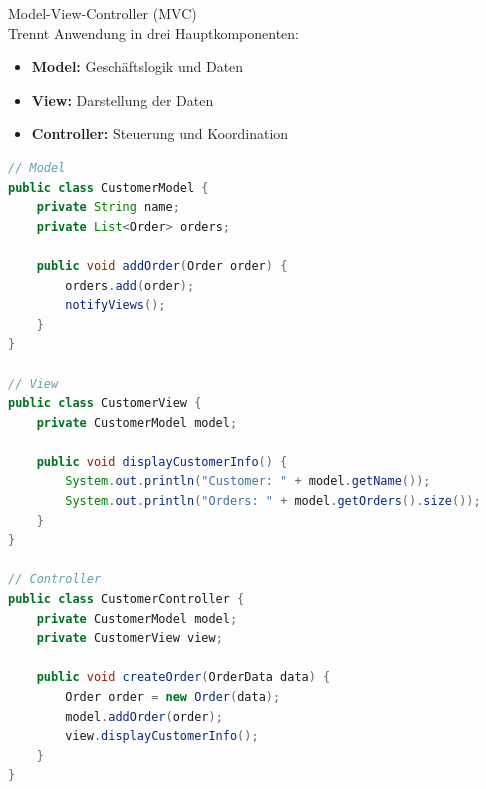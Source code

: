 \begin{concept}{Model-View-Controller (MVC)}\\
Trennt Anwendung in drei Hauptkomponenten:
\begin{itemize}
    \item \textbf{Model:} Geschäftslogik und Daten
    \item \textbf{View:} Darstellung der Daten
    \item \textbf{Controller:} Steuerung und Koordination
\end{itemize}

\begin{lstlisting}[language=Java, style=basesmol]
// Model
public class CustomerModel {
    private String name;
    private List<Order> orders;
    
    public void addOrder(Order order) {
        orders.add(order);
        notifyViews();
    }
}

// View
public class CustomerView {
    private CustomerModel model;
    
    public void displayCustomerInfo() {
        System.out.println("Customer: " + model.getName());
        System.out.println("Orders: " + model.getOrders().size());
    }
}

// Controller
public class CustomerController {
    private CustomerModel model;
    private CustomerView view;
    
    public void createOrder(OrderData data) {
        Order order = new Order(data);
        model.addOrder(order);
        view.displayCustomerInfo();
    }
}
\end{lstlisting}
\end{concept}

